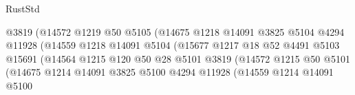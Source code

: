 \begin{lexlean}{RustStd}
\begin{coremodule}
                                            @3819
                                            (@14572
                                              @1219
                                              @50
                                              @5105
                                              (@14675
                                                @1218
                                                @14091
                                                @3825
                                                @5104
                                                @4294
                                                @11928
                                                (@14559
                                                  @1218
                                                  @14091
                                                  @5104
                                                  (@15677
                                                    @1217
                                                    @18
                                                    @52
                                                    @4491
                                                    @5103
                                                    @15691
                                                    (@14564
                                                      @1215
                                                      @120
                                                      @50
                                                      @28
                                                      @5101
                                                      @3819
                                                      (@14572
                                                        @1215
                                                        @50
                                                        @5101
                                                        (@14675
                                                          @1214
                                                          @14091
                                                          @3825
                                                          @5100
                                                          @4294
                                                          @11928
                                                          (@14559
                                                            @1214
                                                            @14091
                                                            @5100

\end{coremodule}
\end{lexlean}
